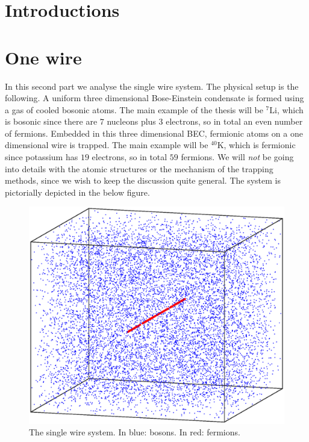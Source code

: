 \documentclass[11pt, twoside]{Thesis} %
\begin{document}
{%

\mainmatter %

\pagestyle{fancy} %



\part{Introductions}
\newpage


 

\part{One wire}
In this second part we analyse the single wire system. The physical setup is the following. A uniform three dimensional Bose-Einstein condensate is formed using a gas of cooled bosonic atoms. The main example of the thesis will be $^{7}\text{Li}$, which is bosonic since there are $7$ nucleons plus $3$ electrons, so in total an even number of fermions. Embedded in this three dimensional BEC, fermionic atoms on a one dimensional wire is trapped. The main example will be $^{40}\text{K}$, which is fermionic since potassium has $19$ electrons, so in total $59$ fermions. We will \textit{not} be going into details with the atomic structures or the mechanism of the trapping methods, since we wish to keep the discussion quite general. The system is pictorially depicted in the below figure.

\vspace{2.5cm}

\begin{figure}[H]
\center
\includegraphics[width=0.8\columnwidth]{gasand1wire.eps}
\\ The single wire system. In blue: bosons. In red: fermions.   
\end{figure}

}
\end{document}
